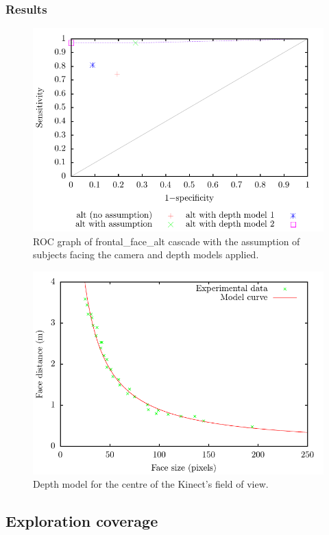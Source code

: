 \documentclass[conference]{IEEEtran}
\begin{document}
\subsubsection{Results}
\begin{figure}
  \includegraphics[width=\columnwidth]{kinect_ROC}
  \caption{ROC graph of frontal\_face\_alt cascade with the assumption of subjects facing the camera and depth models applied.}
  \label{fig:cascade_with_model}
\end{figure}
\begin{figure}
  \includegraphics[width=\columnwidth]{centre_model}
  \caption{Depth model for the centre of the Kinect's field of view.}
  \label{fig:model}
\end{figure}
\subsection{Exploration coverage}
\end{document}
